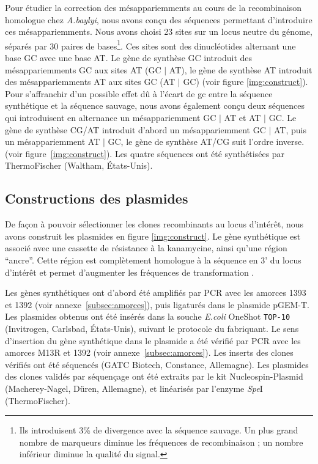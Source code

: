 Pour étudier la correction des mésappariemments au cours de la recombinaison
homologue chez \emph{A.baylyi}, nous avons conçu des séquences permettant
d'introduire ces mésappariemments. Nous avons choisi 23 sites sur un locus
neutre du génome, séparés par 30 paires de bases\footnote{Ils introduisent 3\%
  de divergence avec la séquence sauvage. Un plus grand nombre de marqueurs
  diminue les fréquences de recombinaison ; un nombre inférieur diminue la
  qualité du signal.}. Ces sites sont des dinucléotides alternant une base GC
avec une base AT. Le gène de synthèse GC introduit des mésappariemments GC aux
sites AT (GC $|$ AT), le gène de synthèse AT introduit des mésappariemments AT
aux sites GC (AT $|$ GC) (voir figure \ref{img:construct}). Pour s'affranchir
d'un possible effet dû à l'écart de \ac{gc} entre la séquence synthétique et la
séquence sauvage, nous avons également conçu deux séquences qui introduisent en
alternance un mésappariemment GC $|$ AT et AT $|$ GC. Le gène de synthèse CG/AT
introduit d'abord un mésappariemment GC $|$ AT, puis un mésappariemment AT $|$
GC, le gène de synthèse AT/CG suit l'ordre inverse. (voir
figure~\ref{img:construct}). Les quatre séquences ont été synthétisées par
ThermoFischer (Waltham, États-Unis).

\subsection{Constructions des plasmides}
\label{subsec:constructions}

De façon à pouvoir sélectionner les clones recombinants au locus d'intérêt, nous
avons construit les plasmides en figure \ref{img:construct}. Le gène synthétique
est associé avec une cassette de résistance à la kanamycine, ainsi qu'une région
``ancre''. Cette région est complètement homologue à la séquence en 3' du locus
d'intérêt et permet d'augmenter les fréquences de transformation
\cite{de_vries_integration_2002}.

Les gènes synthétiques ont d'abord été amplifiés par PCR avec les amorces 1393
et 1392 (voir annexe~\ref{subsec:amorces}), puis ligaturés dans le plasmide
pGEM-T. Les plasmides obtenus ont été insérés dans la souche \emph{E.coli}
OneShot\textsuperscript{{\textregistered}} \texttt{TOP-10} (Invitrogen,
Carlsbad, États-Unis), suivant le protocole du fabriquant. Le sens d'insertion
du gène synthétique dans le plasmide a été vérifié par PCR avec les amorces M13R
et 1392 (voir annexe~\ref{subsec:amorces}). Les inserts des clones vérifiés ont
été séquencés (GATC Biotech, Constance, Allemagne). Les plasmides des clones
validés par séquençage ont été extraits par le kit Nucleospin-Plasmid
(Macherey-Nagel, Düren, Allemagne), et linéarisés par l'enzyme \emph{Spe}I
(ThermoFischer).

